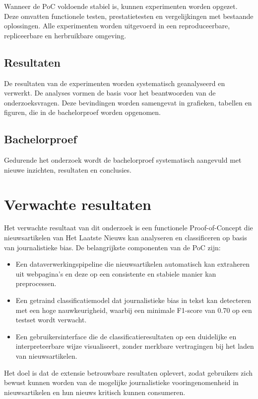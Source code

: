 Wanneer de PoC voldoende stabiel is, kunnen experimenten worden opgezet. Deze omvatten functionele testen, prestatietesten en vergelijkingen met bestaande oplossingen. Alle experimenten worden uitgevoerd in een reproduceerbare, repliceerbare en herbruikbare omgeving.

\subsection{Resultaten}

De resultaten van de experimenten worden systematisch geanalyseerd en verwerkt. De analyses vormen de basis voor het beantwoorden van de onderzoeksvragen. Deze bevindingen worden samengevat in grafieken, tabellen en figuren, die in de bachelorproef worden opgenomen.

\subsection{Bachelorproef}

Gedurende het onderzoek wordt de bachelorproef systematisch aangevuld met nieuwe inzichten, resultaten en conclusies.

\section{Verwachte resultaten}
\label{sec:verwachte-resultaten}

Het verwachte resultaat van dit onderzoek is een functionele Proof-of-Concept die nieuwsartikelen van Het Laatste Nieuws kan analyseren en classificeren op basis van journalistieke bias. De belangrijkste componenten van de PoC zijn:

\begin{itemize}
    \item Een dataverwerkingspipeline die nieuwsartikelen automatisch kan extraheren uit webpagina's en deze op een consistente en stabiele manier kan preprocessen.
    \item Een getraind classificatiemodel dat journalistieke bias in tekst kan detecteren met een hoge nauwkeurigheid, waarbij een minima\-le F1-score van 0.70 op een testset wordt verwacht.
    \item Een gebruikersinterface die de classificatieresultaten op een duidelijke en interpreteerbare wijze visualiseert, zonder merkbare vertragingen bij het laden van nieuwsartikelen.
\end{itemize}

Het doel is dat de extensie betrouwbare resultaten oplevert, zodat gebruikers zich bewust kunnen worden van de mogelijke journalistieke vooringenomenheid in nieuwsartikelen en hun nieuws kritisch kunnen consumeren.

